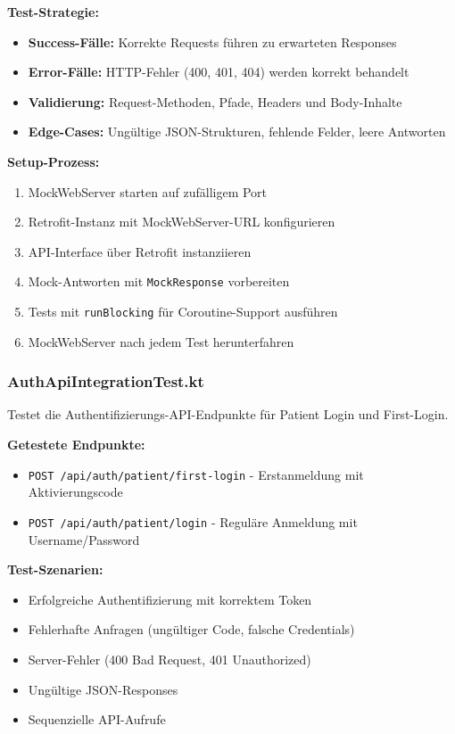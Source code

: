 \noindent\textbf{Test-Strategie:}

\begin{itemize}
  \item \textbf{Success-Fälle:} Korrekte Requests führen zu erwarteten Responses
  \item \textbf{Error-Fälle:} HTTP-Fehler (400, 401, 404) werden korrekt behandelt
  \item \textbf{Validierung:} Request-Methoden, Pfade, Headers und Body-Inhalte
  \item \textbf{Edge-Cases:} Ungültige JSON-Strukturen, fehlende Felder, leere Antworten
\end{itemize}

\noindent\textbf{Setup-Prozess:}
\begin{enumerate}
  \item MockWebServer starten auf zufälligem Port
  \item Retrofit-Instanz mit MockWebServer-URL konfigurieren
  \item API-Interface über Retrofit instanziieren
  \item Mock-Antworten mit \texttt{MockResponse} vorbereiten
  \item Tests mit \texttt{runBlocking} für Coroutine-Support ausführen
  \item MockWebServer nach jedem Test herunterfahren
\end{enumerate}

\subsubsection{AuthApiIntegrationTest.kt}
Testet die Authentifizierungs-API-Endpunkte für Patient Login und First-Login.

\textbf{Getestete Endpunkte:}
\begin{itemize}
  \item \texttt{POST /api/auth/patient/first-login} - Erstanmeldung mit Aktivierungscode
  \item \texttt{POST /api/auth/patient/login} - Reguläre Anmeldung mit Username/Password
\end{itemize}

\textbf{Test-Szenarien:}
\begin{itemize}
  \item Erfolgreiche Authentifizierung mit korrektem Token
  \item Fehlerhafte Anfragen (ungültiger Code, falsche Credentials)
  \item Server-Fehler (400 Bad Request, 401 Unauthorized)
  \item Ungültige JSON-Responses
  \item Sequenzielle API-Aufrufe
\end{itemize}

